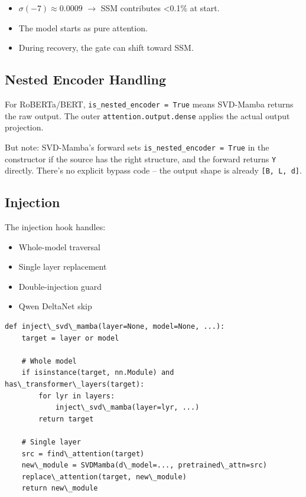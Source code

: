 \begin{itemize}
\item $\sigma(-7) \approx 0.0009$ $\to$ SSM contributes \textless{}0.1\% at start.
\item The model starts as pure attention.
\item During recovery, the gate can shift toward SSM.

\end{itemize}
\subsection{Nested Encoder Handling}

For RoBERTa/BERT, \texttt{is\_nested\_encoder = True} means SVD-Mamba returns the 
raw output. The outer \texttt{attention.output.dense} applies the actual output 
projection.

But note: SVD-Mamba's forward sets \texttt{is\_nested\_encoder = True} in the 
constructor if the source has the right structure, and the forward 
returns \texttt{Y} directly. There's no explicit bypass code -- the output 
shape is already \texttt{[B, L, d]}.

\subsection{Injection}

The injection hook handles:

\begin{itemize}
\item Whole-model traversal
\item Single layer replacement
\item Double-injection guard
\item Qwen DeltaNet skip

\end{itemize}
\begin{lstlisting}
def inject\_svd\_mamba(layer=None, model=None, ...):
    target = layer or model
    
    # Whole model
    if isinstance(target, nn.Module) and has\_transformer\_layers(target):
        for lyr in layers:
            inject\_svd\_mamba(layer=lyr, ...)
        return target
    
    # Single layer
    src = find\_attention(target)
    new\_module = SVDMamba(d\_model=..., pretrained\_attn=src)
    replace\_attention(target, new\_module)
    return new\_module
\end{lstlisting}

